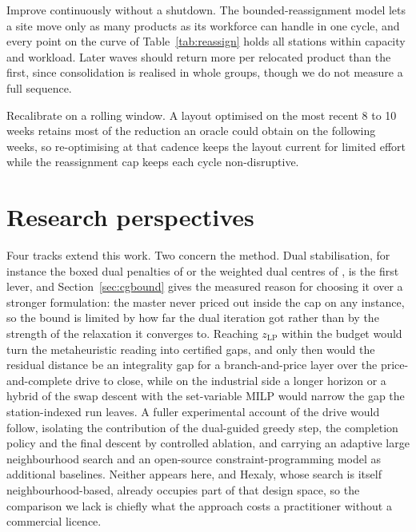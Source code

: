 \documentclass[]{interact}
\begin{document}
Improve continuously without a shutdown. The bounded-reassignment model lets a site move only as many products as its workforce can handle in one cycle, and every point on the curve of Table~\ref{tab:reassign} holds all stations within capacity and workload. Later waves should return more per relocated product than the first, since consolidation is realised in whole groups, though we do not measure a full sequence.

Recalibrate on a rolling window. A layout optimised on the most recent 8 to 10 weeks retains most of the reduction an oracle could obtain on the following weeks, so re-optimising at that cadence keeps the layout current for limited effort while the reassignment cap keeps each cycle non-disruptive.

\section{Research perspectives}\label{sec:perspectives}
Four tracks extend this work. Two concern the method. Dual stabilisation, for instance the boxed dual penalties of \citet{dumerle1999stabilized} or the weighted dual centres of \citet{wentges1997weighted}, is the first lever, and Section~\ref{sec:cgbound} gives the measured reason for choosing it over a stronger formulation: the master never priced out inside the cap on any instance, so the bound is limited by how far the dual iteration got rather than by the strength of the relaxation it converges to. Reaching $z_{\mathrm{LP}}$ within the budget would turn the metaheuristic reading into certified gaps, and only then would the residual distance be an integrality gap for a branch-and-price layer over the price-and-complete drive to close, while on the industrial side a longer horizon or a hybrid of the swap descent with the set-variable MILP would narrow the gap the station-indexed run leaves. A fuller experimental account of the drive would follow, isolating the contribution of the dual-guided greedy step, the completion policy and the final descent by controlled ablation, and carrying an adaptive large neighbourhood search and an open-source constraint-programming model \citep{ropke2006alns, perron2023cpsat} as additional baselines. Neither appears here, and Hexaly, whose search is itself neighbourhood-based, already occupies part of that design space, so the comparison we lack is chiefly what the approach costs a practitioner without a commercial licence.
\end{document}
